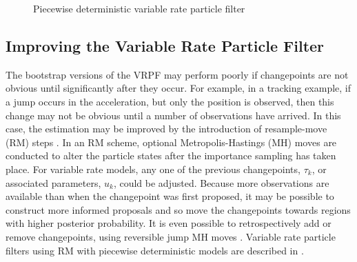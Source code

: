 \documentclass[journal]{IEEEtran}
\begin{document}
\begin{figure}
\caption{Piecewise deterministic variable rate particle filter}
\label{alg:VRPF}
\end{figure}



\subsection{Improving the Variable Rate Particle Filter}

The bootstrap versions of the VRPF may perform poorly if changepoints are not obvious until significantly after they occur. For example, in a tracking example, if a jump occurs in the acceleration, but only the position is observed, then this change may not be obvious until a number of observations have arrived. In this case, the estimation may be improved by the introduction of resample-move (RM) steps \cite{Gilks2001}. In an RM scheme, optional Metropolis-Hastings (MH) moves are conducted to alter the particle states after the importance sampling has taken place. For variable rate models, any one of the previous changepoints, $\tau_k$, or associated parameters, $u_k$, could be adjusted. Because more observations are available than when the changepoint was first proposed, it may be possible to construct more informed proposals and so move the changepoints towards regions with higher posterior probability. It is even possible to retrospectively add or remove changepoints, using reversible jump MH moves \cite{Green1995}. Variable rate particle filters using RM with piecewise deterministic models are described in \cite{Whiteley2011,Gilholm2008}.
\end{document}
